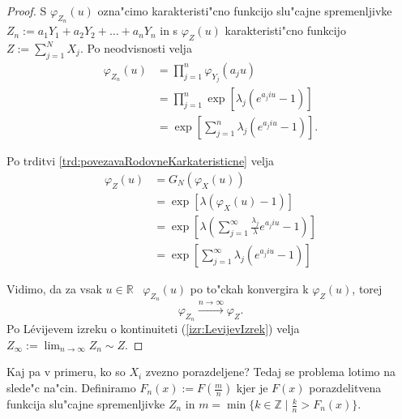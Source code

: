 \documentclass[12pt, a4paper, reqno]{amsart}
\theoremstyle{definition}
\theoremstyle{plain}
\newcommand{\R}{\mathbb{R}}
\newcommand{\1}{\mathds{1}}
\begin{document}
    \begin{proof}
        S $\varphi_{Z_n}(u)$ ozna"cimo karakteristi"cno funkcijo slu"cajne spremenljivke 
        $Z_n := a_1Y_1 + a_2Y_2 + \dots + a_nY_n$ in s $\varphi_{Z}(u)$ karakteristi"cno funkcijo
        $Z:= \sum_{j=1}^{N}X_j$. Po neodvisnosti velja
        \begin{align*}
            \varphi_{Z_n}(u) 
                    &= \prod_{j=1}^{n}\varphi_{Y_j}(a_ju)\\
                    &= \prod_{j=1}^{n}\exp\left[\lambda_j\left(e^{a_j i u} - 1\right)\right] \\
                    &= \exp\left[\sum_{j=1}^{n}\lambda_j\left(e^{a_j i u} - 1\right)\right].
        \end{align*}

        \noindent
        Po trditvi \ref{trd:povezavaRodovneKarkateristicne} velja
        \begin{align*}
            \varphi_{Z}(u) 
                    &= G_N\left(\varphi_X(u)\right) \\
                    &= \exp\left[\lambda\left(\varphi_X(u) - 1\right)\right] \\
                    & = \exp\left[\lambda\left(\sum_{j=1}^\infty\frac{\lambda_j}{\lambda}e^{a_jiu} - 1\right)\right]\\
                    &= \exp\left[\sum_{j=1}^{\infty}\lambda_j\left(e^{a_j i u} - 1\right)\right]
        \end{align*}

        \noindent 
        Vidimo, da za vsak $u\in\R$ \ $\varphi_{Z_n}(u)$ po to"ckah konvergira k $\varphi_{Z}(u)$, torej
        \begin{equation*}
            \varphi_{Z_n} \xrightarrow{n\to\infty}\varphi_Z.
        \end{equation*}
        Po Lévijevem izreku o kontinuiteti (\ref{izr:LevijevIzrek}) velja $Z_\infty :=\lim_{n\to\infty}Z_n \sim Z$.
    \end{proof}

    Kaj pa v primeru, ko so $X_i$ zvezno porazdeljene? 
    Tedaj se problema lotimo na slede"c na"cin. Definiramo $F_n(x) := F(\tfrac{m}{n})$ kjer je
    $F(x)$ porazdelitvena funkcija slu"cajne spremenljivke $Z_n$ in 
    $m = \min\{k \in \mathbb{Z} \mid \tfrac{k}{n} > F_n(x)\}$.
\end{document}
